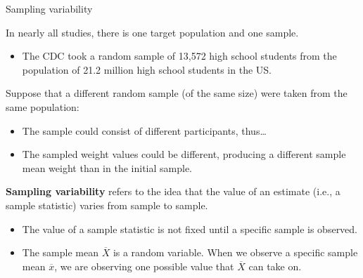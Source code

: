 \documentclass[
  ignorenonframetext,
  aspectratio=169]{beamer}
\providecommand{\tightlist}{%
  \setlength{\itemsep}{0pt}\setlength{\parskip}{0pt}}
\begin{document}
\begin{frame}{Sampling variability}
\protect\hypertarget{sampling-variability-1}{}
\small

In nearly all studies, there is one target population and one sample.

\begin{itemize}
\tightlist
\item
  The CDC took a random sample of 13,572 high school students from the
  population of 21.2 million high school students in the US.
\end{itemize}

Suppose that a different random sample (of the same size) were taken
from the same population:

\begin{itemize}
\item
  The sample could consist of different participants, thus\ldots{}
\item
  The sampled weight values could be different, producing a different
  sample mean weight than in the initial sample.
\end{itemize}

\textbf{Sampling variability} refers to the idea that the value of an
estimate (i.e., a sample statistic) varies from sample to sample.

\begin{itemize}
\item
  The value of a sample statistic is not fixed until a specific sample
  is observed.
\item
  The sample mean \(\overline{X}\) is a random variable. When we observe
  a specific sample mean \(\overline{x}\), we are observing one possible
  value that \(\overline{X}\) can take on.
\end{itemize}
\end{frame}
\end{document}
